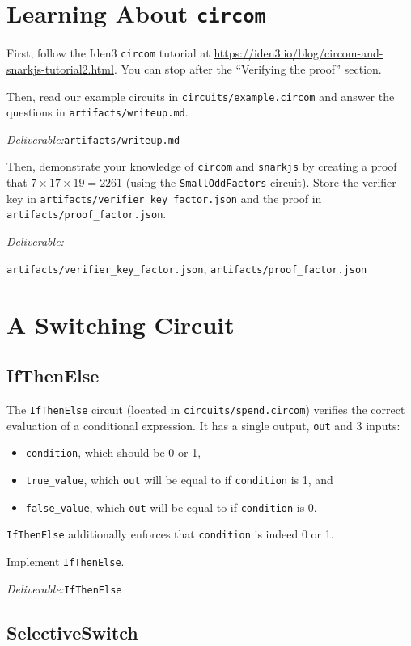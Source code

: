 \documentclass[12pt]{article}
\newcommand{\deliverable}[1]{\begin{tcolorbox}[colback=Gold!8]
\emph{Deliverable:}\xspace #1

\end{tcolorbox}}
\begin{document}
\section{Learning About \texttt{circom}}

First, follow the Iden3 \texttt{circom} tutorial at
\url{https://iden3.io/blog/circom-and-snarkjs-tutorial2.html}. You can stop
after the ``Verifying the proof'' section.

Then, read our example circuits in \texttt{circuits/example.circom} and answer
the questions in \texttt{artifacts/writeup.md}.

\deliverable{\texttt{artifacts/writeup.md}}

Then, demonstrate your knowledge of \texttt{circom} and \texttt{snarkjs} by
creating a proof that $7 \times 17 \times 19 = 2261$ (using the
\texttt{SmallOddFactors} circuit). Store the verifier key in
\texttt{artifacts/verifier\_key\_factor.json} and the proof in
\texttt{artifacts/proof\_factor.json}.
\deliverable{%

\texttt{artifacts/verifier\_key\_factor.json},
\texttt{artifacts/proof\_factor.json}
}


\section{A Switching Circuit}

\subsection{IfThenElse}

The \texttt{IfThenElse} circuit (located in \texttt{circuits/spend.circom})
verifies the correct evaluation of a conditional expression.
It has a single
output, \texttt{out} and 3 inputs:
\begin{itemize}
  \item \texttt{condition}, which should be 0 or 1,
  \item \texttt{true\_value}, which \texttt{out} will be equal to if
    \texttt{condition} is 1, and
  \item \texttt{false\_value}, which \texttt{out} will be equal to if
    \texttt{condition} is 0.
\end{itemize}

\texttt{IfThenElse} additionally enforces that \texttt{condition} is indeed 0 or
1.

Implement \texttt{IfThenElse}.
\deliverable{\texttt{IfThenElse}}

\subsection{SelectiveSwitch}
\end{document}
